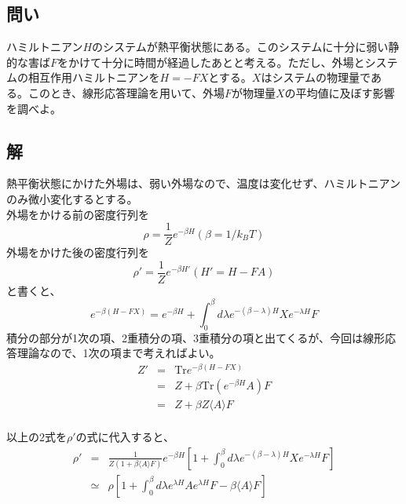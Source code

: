 \documentclass[10pt]{ujarticle}
\begin{document}
\subsection{問い}
ハミルトニアン$H$のシステムが熱平衡状態にある。このシステムに十分に弱い静的な害ば$F$をかけて十分に時間が経過したあとと考える。ただし、外場とシステムの相互作用ハミルトニアンを$H=-FX$とする。$X$はシステムの物理量である。このとき、線形応答理論を用いて、外場$F$が物理量$X$の平均値に及ぼす影響を調べよ。

\subsection{解}
熱平衡状態にかけた外場は、弱い外場なので、温度は変化せず、ハミルトニアンのみ微小変化するとする。\\
外場をかける前の密度行列を
\[
\rho = \frac{1}{Z} e^{-\beta H} \left(\beta = 1/{k_B T} \right)
\]
外場をかけた後の密度行列を
\[
\rho' = \frac{1}{Z} e^{-\beta H'} \left(H'=H-FA\right)
\]
と書くと、
\[
e^{-\beta(H-FX)} = e^{-\beta H} + \int^{\beta}_0 d\lambda e^{-(\beta-\lambda)H} X e^{-\lambda H} F
\]
積分の部分が1次の項、2重積分の項、3重積分の項と出てくるが、今回は線形応答理論なので、1次の項まで考えればよい。
\begin{eqnarray*}
  Z' &=& \mathrm{Tr} e^{-\beta(H-FX)}\\
  &=& Z + \beta\mathrm{Tr}(e^{-\beta H}A) F\\
  &=& Z + \beta Z \langle A \rangle F\\
\end{eqnarray*}

以上の2式を$\rho'$の式に代入すると、
\begin{eqnarray*}
  \rho' &=& \frac{1}{Z(1+\beta\langle A \rangle F)} e^{-\beta H} \left[ 1+ \int^{\beta}_0 d\lambda e^{-(\beta-\lambda)H} X e^{-\lambda H} F \right]\\
  &\simeq& \rho \left[ 1+ \int^{\beta}_0 d\lambda e^{\lambda H} A e^{\lambda H} F -\beta \langle A \rangle F \right]
\end{eqnarray*}
\end{document}
